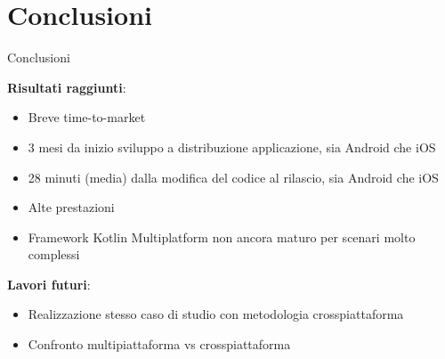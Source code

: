 
\section{Conclusioni}

\begin{frame}{Conclusioni}

    \textbf{Risultati raggiunti}:
    \begin{itemize}
        \item Breve time-to-market
        \item 3 mesi da inizio sviluppo a distribuzione applicazione, sia Android che iOS
        \item 28 minuti (media) dalla modifica del codice al rilascio, sia Android che iOS
        \item Alte prestazioni
        \item Framework Kotlin Multiplatform non ancora maturo per scenari molto complessi
    \end{itemize}

    \vspace{3mm}

    \textbf{Lavori futuri}:
    \begin{itemize}
        \item Realizzazione stesso caso di studio con metodologia crosspiattaforma
        \item Confronto multipiattaforma vs crosspiattaforma
    \end{itemize}
    
\end{frame}
